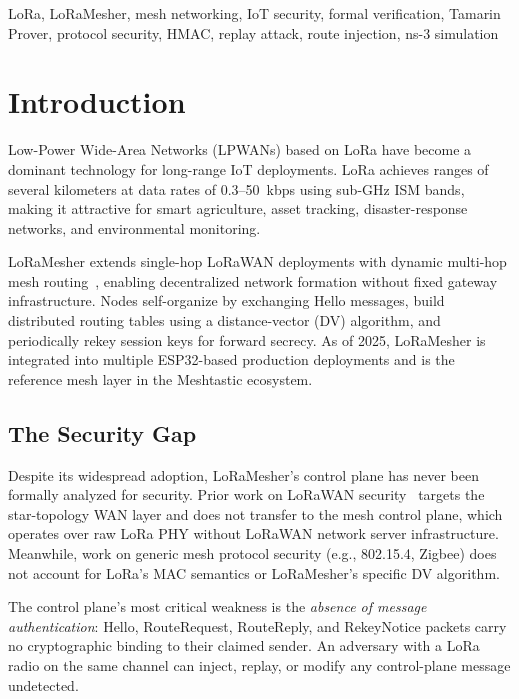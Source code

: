 \documentclass[journal]{IEEEtran}
\begin{document}
\begin{IEEEkeywords}
LoRa, LoRaMesher, mesh networking, IoT security, formal verification,
Tamarin Prover, protocol security, HMAC, replay attack, route injection,
ns-3 simulation
\end{IEEEkeywords}

\section{Introduction}
\label{sec:intro}

Low-Power Wide-Area Networks (LPWANs) based on LoRa have become a
dominant technology for long-range IoT deployments. LoRa achieves
ranges of several kilometers at data rates of 0.3–50~kbps using
sub-GHz ISM bands, making it attractive for smart agriculture, asset
tracking, disaster-response networks, and environmental monitoring.

LoRaMesher extends single-hop LoRaWAN deployments with dynamic
multi-hop mesh routing~\cite{repetto2025-lorawan-drone-attack},
enabling decentralized network formation without fixed gateway
infrastructure. Nodes self-organize by exchanging Hello messages,
build distributed routing tables using a distance-vector (DV)
algorithm, and periodically rekey session keys for forward secrecy.
As of 2025, LoRaMesher is integrated into multiple ESP32-based
production deployments and is the reference mesh layer in the
Meshtastic ecosystem.

\subsection{The Security Gap}

Despite its widespread adoption, LoRaMesher's control plane has
never been formally analyzed for security. Prior work on LoRaWAN
security~\cite{ieee2025-lorawan-key-vulnerability,ieee2025-lorawan-aes-crypto}
targets the star-topology WAN layer and does not transfer to the
mesh control plane, which operates over raw LoRa PHY without
LoRaWAN network server infrastructure. Meanwhile, work on generic
mesh protocol security (e.g., 802.15.4, Zigbee) does not account
for LoRa's MAC semantics or LoRaMesher's specific DV algorithm.

The control plane's most critical weakness is the \emph{absence of
message authentication}: Hello, RouteRequest, RouteReply, and
RekeyNotice packets carry no cryptographic binding to their claimed
sender. An adversary with a LoRa radio on the same channel can
inject, replay, or modify any control-plane message undetected.
\end{document}
